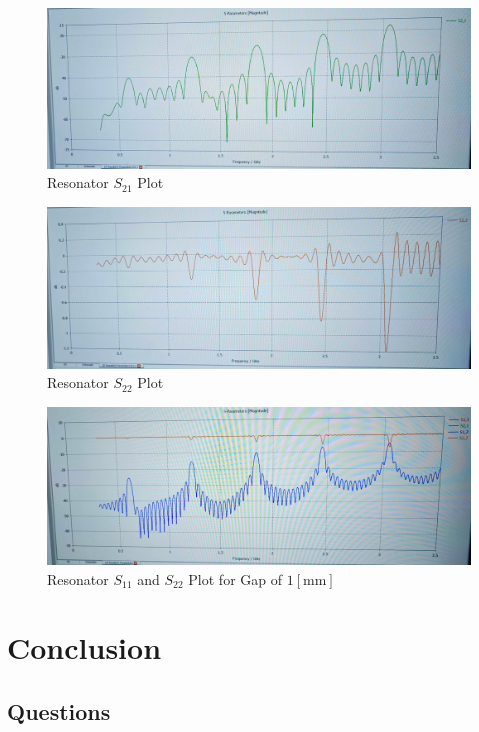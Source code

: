 \documentclass[
	letterpaper, %
	10pt, %
]{CSUniSchoolLabReport}
\begin{document}
\begin{figure}[H]
  \centering
  \includegraphics[width=.9\textwidth]{Figures/Lab Four/Resonator_S21.jpg}
  \caption{Resonator $S_{21}$ Plot}
  \label{fig:15}
\end{figure}

\begin{figure}[H]
  \centering
  \includegraphics[width=.9\textwidth]{Figures/Lab Four/Resonator_S22.jpg}
  \caption{Resonator $S_{22}$ Plot}
  \label{fig:16}
\end{figure}

\begin{figure}[H]
  \centering
  \includegraphics[width=.9\textwidth]{Figures/Lab Four/Resonator_S11_S22.jpg}
  \caption{Resonator $S_{11}$ and $S_{22}$ Plot for Gap of $1[\si{\milli\meter}]$}
  \label{fig:17}
\end{figure}

\section{Conclusion}

\subsection{Questions}
\end{document}
